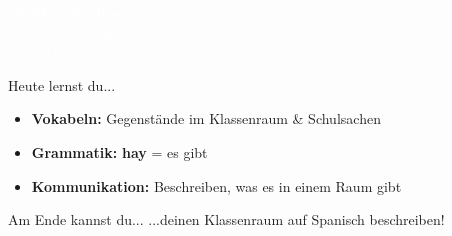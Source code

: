 \documentclass[aspectratio=169, 11pt]{beamer}
\newcommand{\es}[1]{\textbf{\textcolor{spanischrot}{#1}}}
\begin{document}
{
\begin{frame}[plain]
\begin{center}
\vspace{2cm}
{\Huge\bfseries\textcolor{white}{Objetos de clase}}\\[0.5cm]
{\Large\textcolor{white}{Was gibt es im Klassenraum?}}\\[1.5cm]
{\large\textcolor{white}{Spanisch · Klasse 7 · Unidad 2}}
\end{center}
\end{frame}
}

\begin{frame}{Heute lernst du...}
\begin{itemize}
    \item[\textcolor{spanischrot}{\textbullet}] \textbf{Vokabeln:} Gegenstände im Klassenraum \& Schulsachen
    \item[\textcolor{spanischrot}{\textbullet}] \textbf{Grammatik:} \es{hay} = es gibt
    \item[\textcolor{spanischrot}{\textbullet}] \textbf{Kommunikation:} Beschreiben, was es in einem Raum gibt
\end{itemize}

\vspace{1cm}

\begin{block}{Am Ende kannst du...}
...deinen Klassenraum auf Spanisch beschreiben!
\end{block}
\end{frame}
\end{document}
